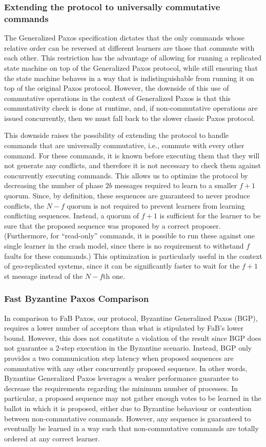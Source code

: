 \subsubsection{Extending the protocol to universally commutative commands}
The Generalized Paxos specification dictates that the only commands whose relative order can be reversed at different learners are those that commute with each other. This restriction has the advantage of allowing for running a replicated state machine on top of the Generalized Paxos protocol, while still ensuring that the state machine behaves in a way that is indistinguishable from running it on top of the original Paxos protocol. However, the downside of this use of commutative operations in the context of Generalized Paxos is that this commutativity check is done at runtime, and, if non-commutative operations are issued
concurrently, then we must fall back to the slower classic Paxos protocol.\par
This downside raises the possibility of extending the protocol to handle commands that are universally commutative, i.e., commute with every
other command. For these commands, it is known before executing them that they will not generate any conflicts, and therefore it is not
necessary to check them against concurrently executing commands. This allows us to optimize the protocol by decreasing the number of phase
$2b$ messages required to learn to a smaller $f+1$ quorum. Since, by definition, these sequences are guaranteed to never produce conflicts,
the $N-f$ quorum is not required to prevent learners from learning conflicting sequences. Instead, a quorum of $f+1$ is sufficient for
the learner to be sure that the proposed sequence was proposed by a correct proposer. (Furthermore, for ``read-only'' commands, it is possible to run these against one single learner in the crash model, since there is no requirement to withstand $f$ faults for these commands.) This optimization is particularly useful in the context of geo-replicated systems, since it can be significantly faster to wait for the $f+1$st message instead of the $N-f$th one.

\subsubsection{Fast Byzantine Paxos Comparison}
In comparison to FaB Paxos, our protocol, Byzantine Generalized Paxos (BGP), requires a lower number of acceptors than what is stipulated by FaB's lower bound. However, this does not constitute a violation of the result since BGP does not guarantee a 2-step execution in the Byzantine scenario. Instead, BGP only provides a two communication step latency when proposed sequences are commutative with any other concurrently proposed sequence. In other words, Byzantine Generalized Paxos leverages a weaker performance guarantee to decrease the requirements regarding the minimum number of processes. In particular, a proposed sequence may not gather enough votes to be learned in the ballot in which it is proposed, either due to Byzantine behaviour or contention between non-commutative commands. However, any sequence is guaranteed to eventually be learned in a way such that non-commutative commands are totally ordered at any correct learner.